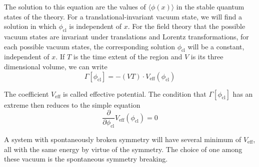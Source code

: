 The solution to this equation are the values of $\langle \phi(x) \rangle$ in the stable quantum states of the theory. For a translational-invariant vacuum state, we will find a solution in which $\phi_{\mathrm{cl}}$ is independent of $x$. 
For the field theory that the possible vacuum states are invariant under translations and Lorentz transformations, for each possible vacuum states, the corresponding solution $\phi_{\mathrm{cl}}$ will be a constant, independent of $x$.
If $T$ is the time extent of the region and $V$ is its three dimensional volume, we can write
\[\Gamma[\phi_{\mathrm{cl}}] = -(VT) \cdot V_{\mathrm{eff}}(\phi_{\mathrm{cl}})\]

The coefficient $V_{\mathrm{eff}}$ is called effective potential. The condition that $\Gamma[\phi_{\mathrm{cl}}]$ has an extreme then reduces to the simple equation
\[\frac{\partial}{\partial \phi_{\mathrm{cl}}} V_{\mathrm{eff}}(\phi_{\mathrm{cl}}) = 0\] 

A system with spontaneously broken symmetry will have several minimum of $V_{\mathrm{eff}}$, all with the same energy by virtue of the symmetry. The choice of one among these vacuum is the spontaneous symmetry breaking.

